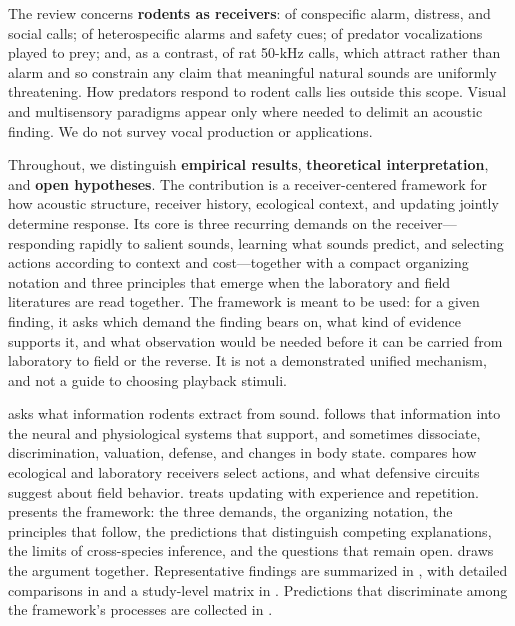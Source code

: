 The review concerns \textbf{rodents as receivers}: of conspecific alarm, distress, and social calls; of heterospecific alarms and safety cues; of predator vocalizations played to prey; and, as a contrast, of rat 50-kHz calls, which attract rather than alarm and so constrain any claim that meaningful natural sounds are uniformly threatening. How predators respond to rodent calls lies outside this scope. Visual and multisensory paradigms appear only where needed to delimit an acoustic finding. We do not survey vocal production or applications.

Throughout, we distinguish \textbf{empirical results}, \textbf{theoretical interpretation}, and \textbf{open hypotheses}. The contribution is a receiver-centered framework for how acoustic structure, receiver history, ecological context, and updating jointly determine response. Its core is three recurring demands on the receiver---responding rapidly to salient sounds, learning what sounds predict, and selecting actions according to context and cost---together with a compact organizing notation and three principles that emerge when the laboratory and field literatures are read together. The framework is meant to be used: for a given finding, it asks which demand the finding bears on, what kind of evidence supports it, and what observation would be needed before it can be carried from laboratory to field or the reverse. It is not a demonstrated unified mechanism, and not a guide to choosing playback stimuli.

 asks what information rodents extract from sound.  follows that information into the neural and physiological systems that support, and sometimes dissociate, discrimination, valuation, defense, and changes in body state.  compares how ecological and laboratory receivers select actions, and what defensive circuits suggest about field behavior.  treats updating with experience and repetition.  presents the framework: the three demands, the organizing notation, the principles that follow, the predictions that distinguish competing explanations, the limits of cross-species inference, and the questions that remain open.  draws the argument together. Representative findings are summarized in , with detailed comparisons in  and a study-level matrix in . Predictions that discriminate among the framework's processes are collected in .
